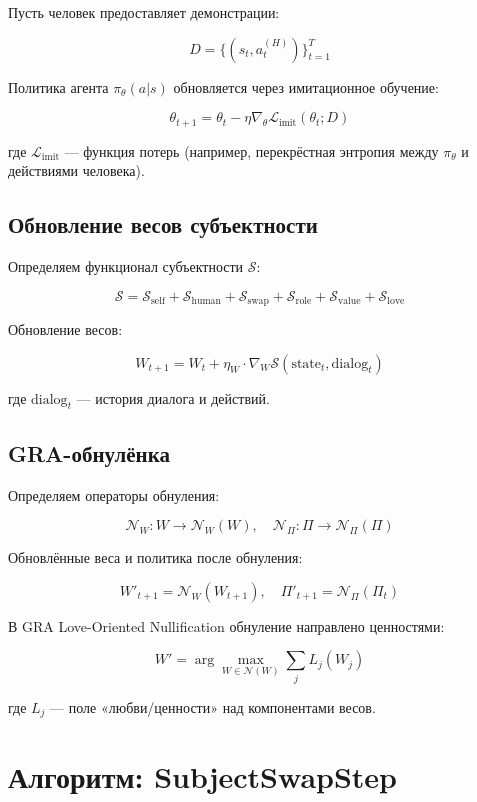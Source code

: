 \documentclass[11pt,a4paper]{article}
\begin{document}
Пусть человек предоставляет демонстрации:

\[
D = \{(s_t, a_t^{(H)})\}_{t=1}^T
\]

Политика агента \(\pi_\theta(a|s)\) обновляется через имитационное обучение:

\[
\theta_{t+1} = \theta_t - \eta \nabla_\theta \mathcal{L}_{\text{imit}}(\theta_t; D)
\]

где \(\mathcal{L}_{\text{imit}}\) — функция потерь (например, перекрёстная энтропия между \(\pi_\theta\) и действиями человека).

\subsection{Обновление весов субъектности}

Определяем функционал субъектности \(\mathcal{S}\):

\[
\mathcal{S} = \mathcal{S}_{\text{self}} + \mathcal{S}_{\text{human}} + \mathcal{S}_{\text{swap}} + \mathcal{S}_{\text{role}} + \mathcal{S}_{\text{value}} + \mathcal{S}_{\text{love}}
\]

Обновление весов:

\[
W_{t+1} = W_t + \eta_W \cdot \nabla_W \mathcal{S}(\text{state}_t, \text{dialog}_t)
\]

где \(\text{dialog}_t\) — история диалога и действий.

\subsection{GRA-обнулёнка}

Определяем операторы обнуления:

\[
\mathcal{N}_W: W \to \mathcal{N}_W(W), \quad
\mathcal{N}_\Pi: \Pi \to \mathcal{N}_\Pi(\Pi)
\]

Обновлённые веса и политика после обнуления:

\[
W'_{t+1} = \mathcal{N}_W(W_{t+1}), \quad
\Pi'_{t+1} = \mathcal{N}_\Pi(\Pi_t)
\]

В GRA Love-Oriented Nullification обнуление направлено ценностями:

\[
W' = \arg\max_{W \in \mathcal{N}(W)} \sum_j L_j(W_j)
\]

где \(L_j\) — поле «любви/ценности» над компонентами весов.

\section{Алгоритм: SubjectSwapStep}
\end{document}
